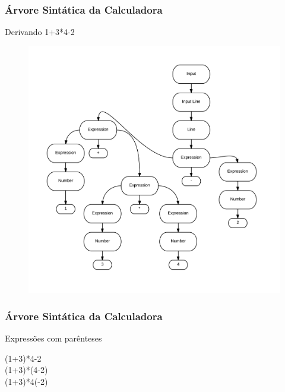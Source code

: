 \documentclass{beamer}
\begin{document}
\begin {frame}
\frametitle{Árvore Sintática da Calculadora }
Derivando 1+3*4-2

\begin{figure} 	%
            \centering		%
            \includegraphics[scale=0.1]{4.png} %
            \end{figure} 

\end{frame}


\begin{frame}
\frametitle{Árvore Sintática da Calculadora }

Expressões com parênteses 

(1+3)*4-2 \\
(1+3)*(4-2) \\
(1+3)*4(-2)

\end{frame}
\end{document}
